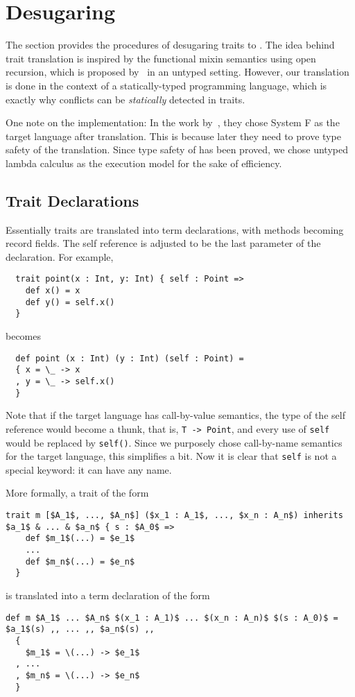 \section{Desugaring}
\label{sec:desugar}


The section provides the procedures of desugaring traits to \bname. The idea
behind trait translation is inspired by the functional mixin semantics using
open recursion, which is proposed by~\citet{cook1989denotational} in an untyped
setting. However, our translation is done in the context of a statically-typed
programming language, which is exactly why conflicts can be \textit{statically}
detected in traits.

One note on the implementation: In the work by~\citet{alpuimdisjoint}, they
chose System F as the target language after translation. This is because later
they need to prove type safety of the translation. Since type safety of \bname
has been proved, we chose untyped lambda calculus as the execution model for the
sake of efficiency.

\subsection{Trait Declarations}

Essentially traits are translated into term declarations, with methods becoming
record fields. The self reference is adjusted to be the last parameter of the
declaration. For example,
\begin{lstlisting}
  trait point(x : Int, y: Int) { self : Point =>
    def x() = x
    def y() = self.x()
  }
\end{lstlisting}
becomes
\begin{lstlisting}
  def point (x : Int) (y : Int) (self : Point) =
  { x = \_ -> x
  , y = \_ -> self.x()
  }
\end{lstlisting}

Note that if the target language has call-by-value semantics, the type of the
self reference would become a thunk, that is, \lstinline$T -> Point$, and every
use of \lstinline{self} would be replaced by \lstinline$self()$. Since we
purposely chose call-by-name semantics for the target language, this simplifies
a bit. Now it is clear that \lstinline{self} is not a special keyword: it can
have any name.

More formally, a trait of the form
\begin{lstlisting}[mathescape=true]
  trait m [$A_1$, ..., $A_n$] ($x_1 : A_1$, ..., $x_n : A_n$) inherits $a_1$ & ... & $a_n$ { s : $A_0$ =>
    def $m_1$(...) = $e_1$
    ...
    def $m_n$(...) = $e_n$
  }
\end{lstlisting}
is translated into a term declaration of the form
\begin{lstlisting}[mathescape=true]
  def m $A_1$ ... $A_n$ $(x_1 : A_1)$ ... $(x_n : A_n)$ $(s : A_0)$ = $a_1$(s) ,, ... ,, $a_n$(s) ,,
  {
    $m_1$ = \(...) -> $e_1$
  , ...
  , $m_n$ = \(...) -> $e_n$
  }
\end{lstlisting}


